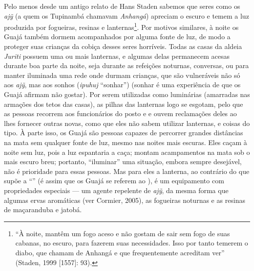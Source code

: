 Pelo menos desde um antigo relato de Hans Staden sabemos que seres como
os \emph{ajỹ} (a quem os Tupinambá chamavam \emph{Anhangá}) apreciam o
escuro e temem a luz produzida por fogueiras, resinas e
lanternas\footnote{``À noite, mantêm um fogo aceso e não gostam de sair
  sem fogo de suas cabanas, no escuro, para fazerem suas necessidades.
  Isso por tanto temerem o diabo, que chamam de Anhangá e que
  frequentemente acreditam ver'' (Staden, 1999 {[}1557{]}: 93).}. Por
motivos similares, à noite os Guajá também dormem acompanhados por
alguma fonte de luz, de modo a proteger suas crianças da cobiça desses
seres horríveis. Todas as casas da aldeia \emph{Juriti} possuem uma ou
mais lanternas, e algumas delas permanecem acesas durante boa parte da
noite, seja durante as refeições noturnas, conversas, ou para manter
iluminada uma rede onde durmam crianças, que são vulneráveis não só aos
\emph{ajỹ}, mas aos sonhos (\emph{ipuhuj} ``sonhar'') (sonhar é uma
experiência de que os Guajá afirmam não gostar). Por serem utilizadas
como luminárias (amarradas nas armações dos tetos das casas), as pilhas
das lanternas logo se esgotam, pelo que as pessoas recorrem aos
funcionários do posto e e ouvem reclamações deles ao lhes fornecer
outras novas, como que eles não sabem utilizar lanternas, e coisas do
tipo. À parte isso, os Guajá são pessoas capazes de percorrer grandes
distâncias na mata sem qualquer fonte de luz, mesmo nas noites mais
escuras. Eles caçam à noite sem luz, pois a luz espantaria a caça;
montam acampamentos na mata sob o mais escuro breu; portanto, ``iluminar''
uma situação, embora sempre desejável, não é prioridade para essas
pessoas. Mas para eles a lanterna, ao contrário do que supõe a ``''
(é assim que os Guajá se referem ao ), é um equipamento com
propriedades especiais --- um agente repelente de \emph{ajỹ}, da mesma
forma que algumas ervas aromáticas (ver Cormier, 2005), as fogueiras
noturnas e as resinas de maçaranduba e jatobá.

